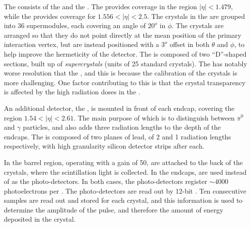 The \ECAL consists of the \EB and the \EE. The \EB provides coverage in the region $|\eta| < 1.479$, while the \EE provides coverage for $1.556 < |\eta| < 2.5$. The crystals in the \EB are grouped into 36 supermodules, each covering an angle of $20^o$ in $\phi$. The crystals are arranged so that they do not point directly at the mean position of the primary interaction vertex, but are instead positioned with a $3^o$ offset in both $\theta$ and $\phi$, to help improve the hermeticity of the detector. The \EE is composed of two ``D''-shaped sections, built up of \emph{supercrystals} (units of 25 standard crystals). The \EE has notably worse resolution that the \EB, and this is because the calibration of the crystals is more challenging. One factor contributing to this is that the crystal transparency is affected by the high radiation doses in the \EE. %

An additional detector, the \ES, is mounted in front of each endcap, covering the region $1.54 <|\eta| < 2.61$. The main purpose of which is to distinguish between $\pi^0$ and $\gamma$ particles, and also adds three radiation lengths to the depth of the \ECAL endcaps. The \ES is composed of two planes of lead, of 2 and 1 radiation lengths respectively, with high granularity silicon detector strips after each. %

In the barrel region, \APDs operating with a gain of 50, are attached to the back of the crystals, where the scintillation light is collected. In the endcaps, \VPTs are used instead of \APDs as the photo-detectors. In both cases, the photo-detectors register $\sim 4000 $ photoelectrons per \GeV. The photo-detectors are read out by 12-bit \ADC. Ten consecutive samples are read out and stored for each crystal, and this information is used to determine the amplitude of the pulse, and therefore the amount of energy deposited in the crystal.

